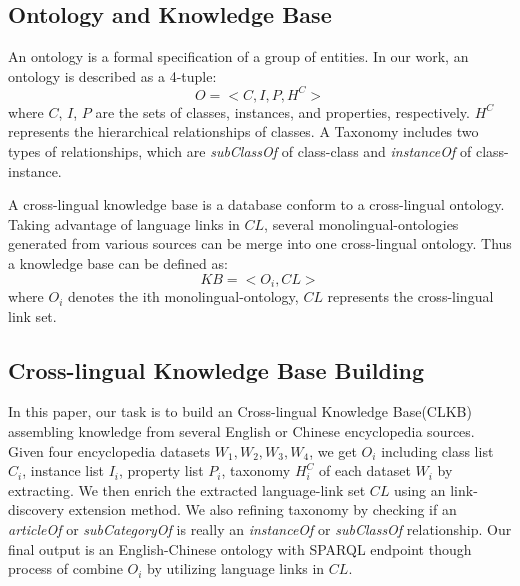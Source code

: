 \documentclass[runningheads,a4paper]{llncs}
\begin{document}
\subsection{Ontology and Knowledge Base}

An ontology is a formal specification of a group of entities. In our work, an ontology is described as a 4-tuple:
\begin{equation}
    O = <C,I,P,H^C>
\end{equation}
where $C$, $I$, $P$ are the sets of classes, instances, and properties, respectively. $H^C$ represents the hierarchical relationships of classes. A Taxonomy includes two types of relationships, which are \textit{subClassOf} of class-class and \textit{instanceOf} of class-instance.

A cross-lingual knowledge base is a database conform to a cross-lingual ontology. Taking advantage of language links in $CL$, several monolingual-ontologies generated from various sources can be merge into one cross-lingual ontology.  Thus a knowledge base can be defined as:
\begin{equation}
    KB = <O_{i}, CL>
\end{equation}
where $O_{i}$ denotes the ith monolingual-ontology, $CL$ represents the cross-lingual link set.

\subsection{Cross-lingual Knowledge Base Building}

In this paper, our task is to build an Cross-lingual Knowledge Base(CLKB) assembling knowledge from several English or Chinese encyclopedia sources. Given four encyclopedia datasets $W_{1},W_{2},W_{3},W_{4}$, we get $O_{i}$ including class list $C_{i}$, instance list $I_{i}$, property list $P_{i}$, taxonomy $H^C_{i}$ of each dataset $W_{i}$ by extracting. We then enrich the extracted language-link set $CL$ using an link-discovery extension method. We also refining taxonomy by checking if an \textit{articleOf} or \textit{subCategoryOf} is really an \textit{instanceOf} or \textit{subClassOf} relationship. Our final output is an English-Chinese ontology  with SPARQL endpoint though process of combine $O_{i}$ by utilizing language links in $CL$.
\end{document}
